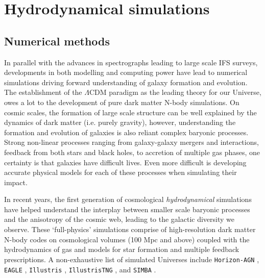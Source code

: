 \section{Hydrodynamical simulations} \label{sec:hydro_sims_intro}
\subsection{Numerical methods}
In parallel with the advances in spectrographs leading to large scale IFS surveys, developments in both modelling and computing power have lead to numerical simulations driving forward understanding of galaxy formation and evolution. The establishment of the $\Lambda$CDM paradigm as the leading theory for our Universe, owes a lot to the development of pure dark matter N-body simulations. On cosmic scales, the formation of large scale structure can be well explained by the dynamics of dark matter (i.e. purely gravity), however, understanding the formation and evolution of galaxies is also reliant complex baryonic processes. Strong non-linear processes ranging from galaxy-galaxy mergers and interactions, feedback from both stars and black holes, to accretion of multiple gas phases, one certainty is that galaxies have difficult lives. Even more difficult is developing accurate physical models for each of these processes when simulating their impact.

In recent years, the first generation of cosmological \textit{hydrodynamical} simulations have helped understand the interplay between smaller scale baryonic processes and the anisotropy of the cosmic web, leading to the galactic diversity we observe. These `full-physics' simulations comprise of high-resolution dark matter N-body codes on cosmological volumes (100 Mpc and above) coupled with the hydrodynamics of gas and models for star formation and multiple feedback prescriptions. A non-exhaustive list of simulated Universes include \texttt{Horizon-AGN} \citep{dubois2014}, \texttt{EAGLE} \citep{schaye2015}, \texttt{Illustris} \citep{vogelsberger2014a, vogelsberger2014b, genel2014, sijacki2015}, \texttt{IllustrisTNG} \citep{marinacci18, naiman18, nelson18, pillepich18a, springel18}, and \texttt{SIMBA} \citep{dave2019}. 

